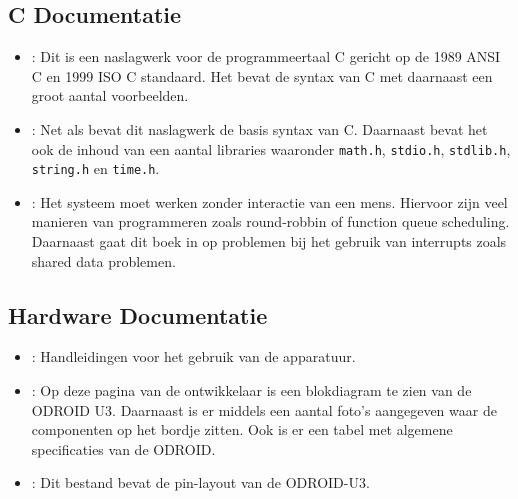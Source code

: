 \subsection{C Documentatie}
\begin{itemize}
\item \cite{c_manual}: Dit is een naslagwerk voor de programmeertaal C gericht op de 1989 ANSI C en 1999 ISO C standaard. Het bevat de syntax van C met daarnaast een groot aantal voorbeelden.

\item \cite{c_manual_2}: Net als \cite{c_manual} bevat dit naslagwerk de basis syntax van C. Daarnaast bevat het ook de inhoud van een aantal libraries waaronder \verb|math.h|, \verb|stdio.h|, \verb|stdlib.h|, \verb|string.h| en \verb|time.h|.

\item \cite{Embedded}: Het systeem moet werken zonder interactie van een mens. Hiervoor zijn veel manieren van programmeren zoals round-robbin of function queue scheduling. Daarnaast gaat dit boek in op problemen bij het gebruik van interrupts zoals shared data problemen.
\end{itemize}

\subsection{Hardware Documentatie}
\begin{itemize}
\item \cite{GXPanel,invCharg,sensor}: Handleidingen voor het gebruik van de apparatuur.

\item \cite{ODROID_specs}: Op deze pagina van de ontwikkelaar is een blokdiagram te zien van de ODROID U3. Daarnaast is er middels een aantal foto's aangegeven waar de componenten op het bordje zitten. Ook is er een tabel met algemene specificaties van de ODROID.

\item \cite{ODROID_schematics}: Dit bestand bevat de pin-layout van de ODROID-U3.

\end{itemize}
